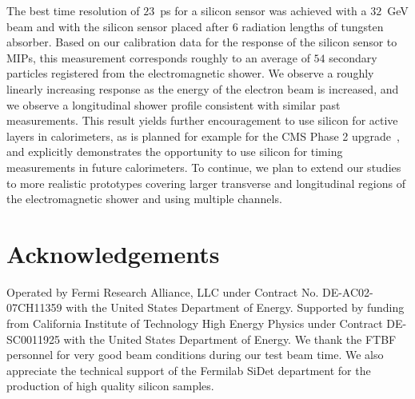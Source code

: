 \documentclass[preprint,1p]{elsarticle}
\begin{document}
The best time resolution of $23$~ps for a silicon sensor was achieved with a $32$~GeV beam 
and with the silicon sensor placed after 6 radiation
lengths of tungsten absorber. Based on our calibration data for the response of the
silicon sensor to MIPs, this measurement corresponds roughly to 
an average of $54$ secondary particles registered from the electromagnetic shower. 
We observe a roughly linearly increasing response as the energy of the electron beam
is increased, and we observe a longitudinal shower profile consistent with similar 
past measurements. This result yields further encouragement to use silicon for 
active layers in calorimeters, as is planned for example for the CMS Phase 2 
upgrade~\cite{Butler:2020886}, and explicitly demonstrates the opportunity 
to use silicon for timing measurements in future calorimeters. To continue, we plan to 
extend our studies to more realistic prototypes covering larger transverse and longitudinal 
regions of the electromagnetic shower and using multiple channels. 


\section{Acknowledgements} Operated by Fermi Research Alliance, LLC under
Contract No. DE-AC02-07CH11359 with the United States Department of Energy.
Supported by funding from California Institute of Technology High Energy Physics
under Contract DE-SC0011925 with the United States Department of Energy. We
thank the FTBF personnel for very good beam conditions during our test beam
time. We also appreciate the technical support of the Fermilab SiDet department
for the production of high quality silicon samples. 





{}
 




\end{document}
